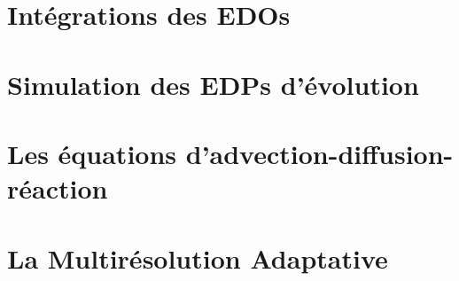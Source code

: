 \section{Intégrations des EDOs}\label{par:edo}

\section{Simulation des EDPs d'évolution}\label{par:sim_edp}

\section{Les équations d'advection-diffusion-réaction}
\label{par:adv-diff-reaction}

\newpage
\section{La Multirésolution Adaptative}
\label{par:explication_MRA}

